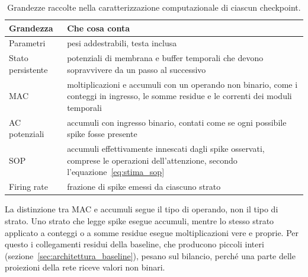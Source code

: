 \begin{table}[t]
\centering
\small
\renewcommand{\arraystretch}{1.2}
\caption[Grandezze della caratterizzazione computazionale]{Grandezze raccolte nella caratterizzazione computazionale di ciascun checkpoint.}
\label{tab:contatori_profilo}
\begin{tabularx}{\textwidth}{@{}>{\raggedright\arraybackslash}p{3.2cm} >{\raggedright\arraybackslash}X@{}}
\hline
\textbf{Grandezza} & \textbf{Che cosa conta} \\
\hline
Parametri & pesi addestrabili, testa inclusa \\
Stato persistente & potenziali di membrana e buffer temporali che devono sopravvivere da un passo al successivo \\
MAC & moltiplicazioni e accumuli con un operando non binario, come i conteggi in ingresso, le somme residue e le correnti dei moduli temporali \\
AC potenziali & accumuli con ingresso binario, contati come se ogni possibile spike fosse presente \\
SOP & accumuli effettivamente innescati dagli spike osservati, comprese le operazioni dell'attenzione, secondo l'equazione~\eqref{eq:stima_sop} \\
Firing rate & frazione di spike emessi da ciascuno strato \\
\hline
\end{tabularx}
\end{table}

La distinzione tra MAC e accumuli segue il tipo di operando, non il tipo di strato. Uno strato che legge spike esegue accumuli, mentre lo stesso strato applicato a conteggi o a somme residue esegue moltiplicazioni vere e proprie. Per questo i collegamenti residui della baseline, che producono piccoli interi (sezione~\ref{sec:architettura_baseline}), pesano sul bilancio, perché una parte delle proiezioni della rete riceve valori non binari.

